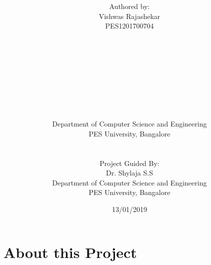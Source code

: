 \documentclass[14pt]{extreport}
\title{\textbf{}}
\author{Authored by:\\Vishwas Rajashekar \\ PES1201700704\\
\\ \\ \\
\\ \\ \\
\\ \\ \\
Department of Computer Science and Engineering\\
PES University, Bangalore\\\\\\
Project Guided By:\\
Dr. Shylaja S.S\\
Department of Computer Science and Engineering\\
PES University, Bangalore}
\date{13/01/2019}
\begin{document}
\maketitle

\section{About this Project}
\end{document}
